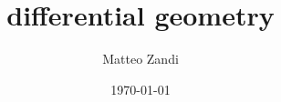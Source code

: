 \documentclass[a4paper, 12pt, openany]{memoir}
\title{differential geometry}
\author{Matteo Zandi}
\date{\today}
\begin{document}
\frontmatter



\tableofcontents

\mainmatter




\nocite{schutz}
\nocite{carroll}
\nocite{tonggr}
\nocite{casadio}

\backmatter

\listoftheorems

\clearpage
{}
\printbibliography
\end{document}
